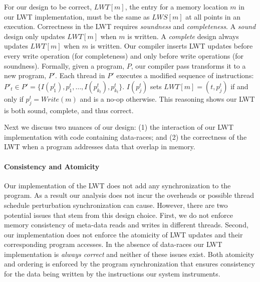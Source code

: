 \documentclass[preprint,9pt]{sigplanconf}
\newcommand{\lwt}{LWT\xspace}
\begin{document}
For our design to be correct, $LWT[m]$, the entry for a memory location $m$ in
our \lwt implementation, must be the same as $LWS[m]$ at all points in an
execution.  Correctness in the \lwt requires {\em soundness} and {\em
completeness}.  A {\em sound} design only updates $LWT[m]$ when $m$ is written.
A {\em complete} design always updates $LWT[m]$ when $m$ is written.  Our
compiler inserts \lwt updates before every write operation (for completeness)
and only before write operations (for soundness).  Formally, given a program,
$P$, our compiler pass transforms it to a new program, $P'$.  Each thread in
$P'$ executes a modified sequence of instructions: $P'_{t} \in P' = \{
I(p^{t}_{1}), p^{t}_{1}, \ldots, I(p^{t}_{k_{t}}), p^{t}_{k_{t}} \}$.
$I(p^{t}_{j})$ sets $LWT[m] = (t,p^{t}_{j})$ if and only if $p^{t}_{j} =
Write(m)$ and is a no-op otherwise.  This reasoning shows our \lwt is both
sound, complete, and thus correct.

Next we discuss two nuances of our design: (1) the interaction of our \lwt
implementation with code containing data-races; and (2) the correctness of the
\lwt when a program addresses data that overlap in memory. 

\paragraph{Consistency and Atomicity}

Our implementation of the \lwt does not add any synchronization to the program.
As a result our analysis does not incur the overheads or possible thread
schedule perturbation synchronization can cause.  However, there are two
potential issues that stem from this design choice. First, we do not enforce
memory consistency of meta-data reads and writes in different threads.  Second,
our implementation does not enforce the atomicity of \lwt updates and their
corresponding program accesses.  In the absence of data-races our \lwt
implementation is {\em always correct} and neither of these issues exist.  Both
atomicity and ordering is enforced by the program synchronization that ensures
consistency for the data being written by the instructions our system
instruments.   
\end{document}
